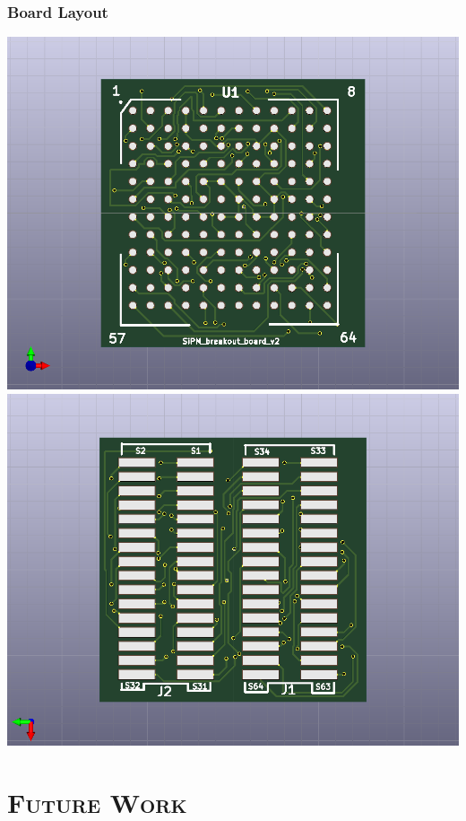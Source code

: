 \documentclass[xcolor=x11names, compress, handout]{beamer}
\renewcommand{\(}{\begin{columns}}
\renewcommand{\)}{\end{columns}}
\newcommand{\<}[1]{\begin{column}{#1}}
\renewcommand{\>}{\end{column}}
\begin{document}
\begin{frame}[c]
\frametitle{Board Layout}
\centering
  \includegraphics[scale=0.1]{images/pcb_sipm_front.png}
  \includegraphics[scale=0.1]{images/pcb_sipm_back.png}
\end{frame}



\section{\scshape Future Work}
\end{document}
